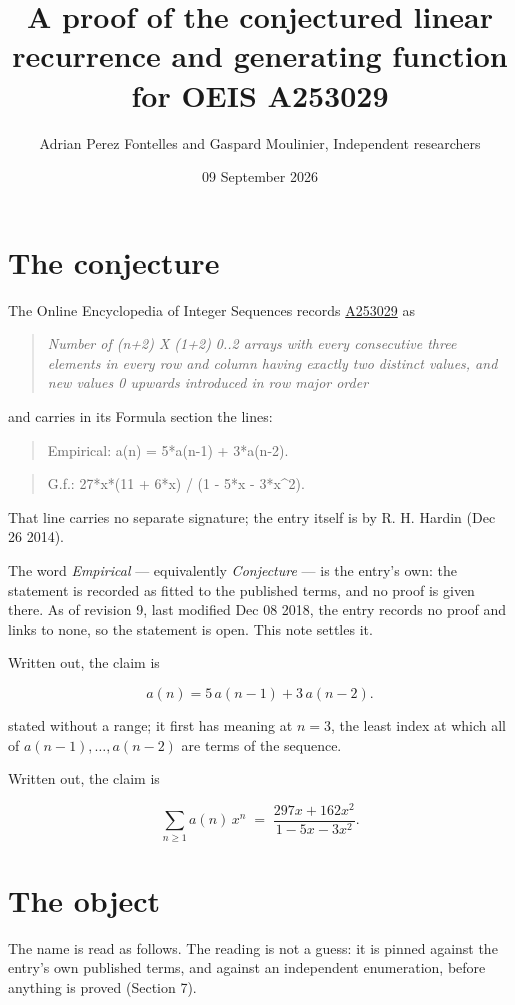 \documentclass[11pt]{article}
\title{A proof of the conjectured linear recurrence and generating function for OEIS A253029}
\author{Adrian Perez Fontelles and Gaspard Moulinier, Independent researchers}
\date{09 September 2026}
\theoremstyle{definition}
\begin{document}
\maketitle
\section{The conjecture}

The Online Encyclopedia of Integer Sequences records \href{https://oeis.org/A253029}{A253029} as

\begin{quote}\itshape Number of (n+2) X (1+2) 0..2 arrays with every consecutive three elements in every row and column having exactly two distinct values, and new values 0 upwards introduced in row major order\end{quote}

and carries in its Formula section the lines:

\begin{quote}\ttfamily Empirical: a(n) = 5*a(n-1) + 3*a(n-2).\end{quote}

\begin{quote}\ttfamily G.f.: 27*x*(11 + 6*x) / (1 - 5*x - 3*x\textasciicircum{}2).\end{quote}

That line carries no separate signature; the entry itself is by R. H. Hardin (Dec 26 2014).

The word {\itshape Empirical} --- equivalently {\itshape Conjecture} --- is the entry's own: the statement is recorded as fitted to the published terms, and no proof is given there. As of revision 9, last modified Dec 08 2018, the entry records no proof and links to none, so the statement is open. This note settles it.

Written out, the claim is

\[a(n) = 5\,a(n-1) + 3\,a(n-2).\]

stated without a range; it first has meaning at $n = 3$, the least index at which all of $a(n-1),\dots,a(n-2)$ are terms of the sequence.

Written out, the claim is

\[\sum_{n \ge 1} a(n)\,x^n \;=\; \frac{297x + 162x^{2}}{1 - 5x - 3x^{2}}.\]

\section{The object}

The name is read as follows. The reading is not a guess: it is pinned against the entry's own published terms, and against an independent enumeration, before anything is proved (Section 7).
\end{document}
